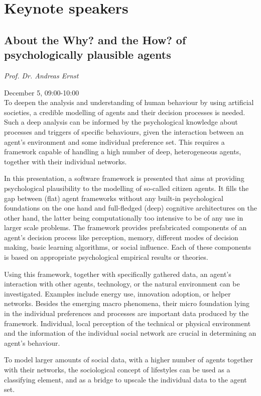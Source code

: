 \chapter{Keynote speakers}
\section{About the Why? and the How? of psychologically plausible agents}

\noindent \textit{Prof. Dr. Andreas Ernst}

\noindent December 5, 09:00-10:00
\\

\noindent To deepen the analysis and understanding of human behaviour by
using artificial societies, a credible modelling of agents and their decision
processes is needed. Such a deep analysis can be informed by the psychological
knowledge about processes and triggers of specific behaviours, given the
interaction between an agent’s environment and some individual preference set.
This requires a framework capable of handling a high number of deep,
heterogeneous agents, together with their individual networks.

In this presentation, a software framework is presented that aims at providing
psychological plausibility to the modelling of so-called citizen agents. It
fills the gap between (flat) agent frameworks without any built-in psychological
foundations on the one hand and full-fledged (deep) cognitive architectures on
the other hand, the latter being computationally too intensive to be of any use
in larger scale problems. The framework provides prefabricated components of an
agent’s decision process like perception, memory, different modes of decision
making, basic learning algorithms, or social influence. Each of these components
is based on appropriate psychological empirical results or theories.

Using this framework, together with specifically gathered data, an agent’s
interaction with other agents, technology, or the natural environment can be
investigated. Examples include energy use, innovation adoption, or helper
networks. Besides the emerging macro phenomena, their micro foundation lying in
the individual preferences and processes are important data produced by the
framework. Individual, local perception of the technical or physical environment
and the information of the individual social network are crucial in determining
an agent’s behaviour.

To model larger amounts of social data, with a higher number of agents together
with their networks, the sociological concept of lifestyles can be used as a
classifying element, and as a bridge to upscale the individual data to the agent
set.\\

